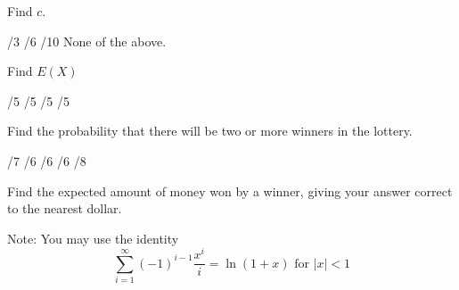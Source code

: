 \documentclass[letterpaper,10pt,addpoints]{exam}
\begin{document}
\begin{questions}

\question Find $c$.
\begin{choices}
  /3
  /6
  /10
  \choice None of the above.
\end{choices}
\question Find $E(X)$
\begin{choices}
  /5
  /5
  /5
  /5
\end{choices}
\question Find the probability that there will be two or more winners in the lottery.
\begin{choices}
  /7
  /6
  /6
  /6
  /8
\end{choices}

\question Find the expected amount of money won by a winner, giving your answer correct to the nearest dollar.

Note: You may use the identity
$$
\sum_{i=1}^{\infty}(-1)^{i-1} \frac{x^i}{i}=\ln (1+x) \text { for }|x|<1
$$
\begin{choices}
\end{choices}






\end{questions}
\end{document}
